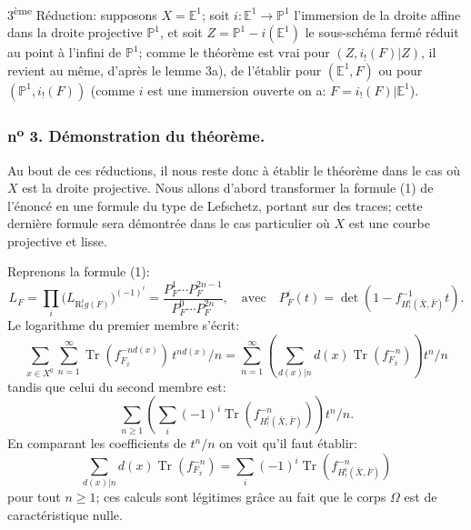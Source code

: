 \documentclass[11pt]{article}
\providecommand{\Tr}{\operatorname{Tr}}
\providecommand{\Tr}{\operatorname{Tr}}
\providecommand{\Tr}{\operatorname{Tr}}
\providecommand{\Tr}{\operatorname{Tr}}
\providecommand{\Tr}{\operatorname{Tr}}
\begin{document}
3\textsuperscript{ème} Réduction: supposons $X=\mathbb E^1$; soit $i:\mathbb E^1\to\mathbb P^1$ l'immersion de la droite affine dans la droite projective $\mathbb P^1$, et soit $Z=\mathbb P^1-i(\mathbb E^1)$ le sous-schéma fermé réduit au point à l'infini de $\mathbb P^1$; comme le théorème est vrai pour $(Z,i_!(F)|Z)$, il revient au même, d'après le lemme 3a), de l'établir pour $(\mathbb E^1,F)$ ou pour $(\mathbb P^1,i_!(F))$ (comme $i$ est une immersion ouverte on a: $F=i_!(F)|\mathbb E^1$).

\subsubsection*{n\textsuperscript{o} 3. Démonstration du théorème.}

Au bout de ces réductions, il nous reste donc à établir le théorème dans le cas où $X$ est la droite projective. Nous allons d'abord transformer la formule (1) de l'énoncé en une formule du type de Lefschetz, portant sur des traces; cette dernière formule sera démontrée dans le cas particulier où $X$ est une courbe projective et lisse.

Reprenons la formule (1):
\[
L_F=\prod_i\bigl(L_{\mathrm{R}^i_!g(F)}\bigr)^{(-1)^i}
=\frac{P_F^1\cdots P_F^{2n-1}}{P_F^0\cdots P_F^{2n}},
\quad\text{avec}\quad
P_F^i(t)=\det(1-f^{-1}_{H^i_!(\bar X,\bar F)}t).
\]
Le logarithme du premier membre s'écrit:
\[
\sum_{x\in X^0}\sum_{n=1}^{\infty}\Tr(f_{F_{\bar x}}^{-n d(x)})\,t^{n d(x)}/n
=\sum_{n=1}^{\infty}\left(\sum_{d(x)|n} d(x)\Tr(f_{F_{\bar x}}^{-n})\right)t^n/n
\]
tandis que celui du second
membre est:
\[
\sum_{n\ge1}\left(\sum_i(-1)^i\Tr(f^{-n}_{H^i_!(\bar X,\bar F)})\right)t^n/n.
\]
En comparant les coefficients de $t^n/n$ on voit qu'il faut établir:
\[
\sum_{d(x)|n}d(x)\Tr(f_{F_{\bar x}}^{-n})
=\sum_i(-1)^i\Tr(f^{-n}_{H^i_!(\bar X,\bar F)})
\tag{2}
\]
pour tout $n\ge1$; ces calculs sont légitimes grâce au fait que le corps $\Omega$ est de caractéristique nulle.
\end{document}
